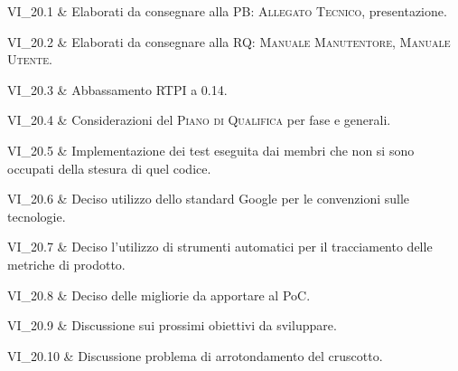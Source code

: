 VI\_20.1 & Elaborati da consegnare alla PB: \textsc{Allegato Tecnico}, presentazione.

\tabularnewline

VI\_20.2 & Elaborati da consegnare alla RQ: \textsc{Manuale Manutentore}, \textsc{Manuale Utente}.

\tabularnewline

VI\_20.3 & Abbassamento RTPI a 0.14.

\tabularnewline

VI\_20.4 & Considerazioni del \textsc{Piano di Qualifica} per fase e generali.

\tabularnewline

VI\_20.5 & Implementazione dei test eseguita dai membri che non si sono occupati della stesura di quel codice.

\tabularnewline

VI\_20.6 & Deciso utilizzo dello standard Google per le convenzioni sulle tecnologie.

\tabularnewline

VI\_20.7 & Deciso l'utilizzo di strumenti automatici per il tracciamento delle metriche di prodotto.

\tabularnewline

VI\_20.8 & Deciso delle migliorie da apportare al PoC.

\tabularnewline

VI\_20.9 & Discussione sui prossimi obiettivi da sviluppare.

\tabularnewline

VI\_20.10 & Discussione problema di arrotondamento del cruscotto.
